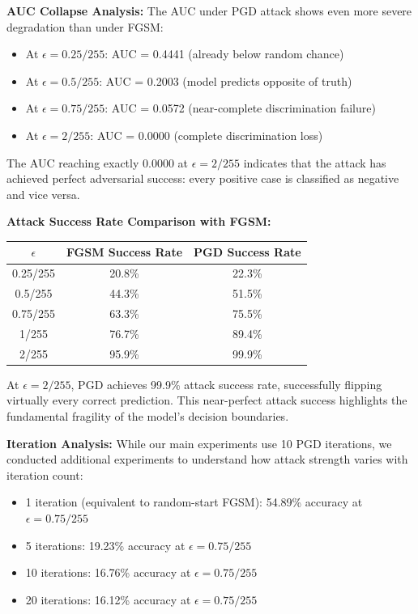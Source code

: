 \documentclass[12pt,a4paper]{article}
\begin{document}
\textbf{AUC Collapse Analysis:} The AUC under PGD attack shows even more severe degradation than under FGSM:
\begin{itemize}[leftmargin=*]
    \item At $\epsilon=0.25/255$: AUC = 0.4441 (already below random chance)
    \item At $\epsilon=0.5/255$: AUC = 0.2003 (model predicts opposite of truth)
    \item At $\epsilon=0.75/255$: AUC = 0.0572 (near-complete discrimination failure)
    \item At $\epsilon=2/255$: AUC = 0.0000 (complete discrimination loss)
\end{itemize}

The AUC reaching exactly 0.0000 at $\epsilon=2/255$ indicates that the attack has achieved perfect adversarial success: every positive case is classified as negative and vice versa.

\textbf{Attack Success Rate Comparison with FGSM:}
\begin{center}
\begin{tabular}{ccc}
\toprule
$\epsilon$ & FGSM Success Rate & PGD Success Rate \\
\midrule
0.25/255 & 20.8\% & 22.3\% \\
0.5/255 & 44.3\% & 51.5\% \\
0.75/255 & 63.3\% & 75.5\% \\
1/255 & 76.7\% & 89.4\% \\
2/255 & 95.9\% & 99.9\% \\
\bottomrule
\end{tabular}
\end{center}

At $\epsilon=2/255$, PGD achieves 99.9\% attack success rate, successfully flipping virtually every correct prediction. This near-perfect attack success highlights the fundamental fragility of the model's decision boundaries.

\textbf{Iteration Analysis:} While our main experiments use 10 PGD iterations, we conducted additional experiments to understand how attack strength varies with iteration count:
\begin{itemize}[leftmargin=*]
    \item 1 iteration (equivalent to random-start FGSM): 54.89\% accuracy at $\epsilon=0.75/255$
    \item 5 iterations: 19.23\% accuracy at $\epsilon=0.75/255$
    \item 10 iterations: 16.76\% accuracy at $\epsilon=0.75/255$
    \item 20 iterations: 16.12\% accuracy at $\epsilon=0.75/255$
\end{itemize}
\end{document}
